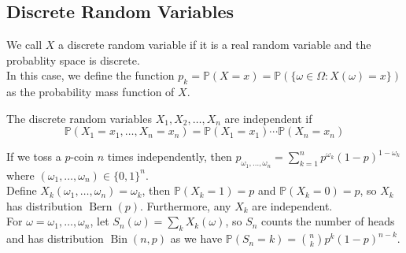 \subsection{Discrete Random Variables}
\begin{definition}
    We call $X$ a discrete random variable if it is a real random variable and the probablity space is discrete.\\
    In this case, we define the function $p_k=\mathbb P(X=x)=\mathbb P(\{\omega\in\Omega:X(\omega)=x\})$ as the probability mass function of $X$.
\end{definition}
\begin{definition}
    The discrete random variables $X_1,X_2,\ldots,X_n$ are independent if
    $$\mathbb P(X_1=x_1,\ldots,X_n=x_n)=\mathbb P(X_1=x_1)\cdots\mathbb P(X_n=x_n)$$
\end{definition}
\begin{example}
    If we toss a $p$-coin $n$ times independently, then $p_{\omega_1,\ldots,\omega_n}=\sum_{k=1}^n p^{\omega_k}(1-p)^{1-\omega_k}$ where $(\omega_1,\ldots,\omega_n)\in\{0,1\}^n$.\\
    Define $X_k(\omega_1,\ldots,\omega_n)=\omega_k$, then $\mathbb P(X_k=1)=p$ and $\mathbb P(X_k=0)=p$, so $X_k$ has distribution $\operatorname{Bern}(p)$.
    Furthermore, any $X_k$ are independent.\\
    For $\omega=\omega_1,\ldots,\omega_n$, let $S_n(\omega)=\sum_kX_k(\omega)$, so $S_n$ counts the number of heads and has distribution $\operatorname{Bin}(n,p)$ as we have $\mathbb P(S_n=k)=\binom{n}{k}p^k(1-p)^{n-k}$.
\end{example}
